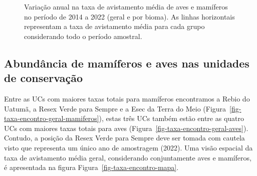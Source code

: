 \documentclass[
  letterpaper,
]{scrbook}
\begin{document}
\begin{figure}[H]


\caption{\label{fig-taxa-encontro-tempo}Variação anual na taxa de
avistamento média de aves e mamíferos no período de 2014 a 2022 (geral e
por bioma). As linhas horizontais representam a taxa de avistamento
média para cada grupo considerando todo o período amostral.}

\end{figure}%

\subsection{Abundância de mamíferos e aves nas unidades de
conservação}\label{abunduxe2ncia-de-mamuxedferos-e-aves-nas-unidades-de-conservauxe7uxe3o}

Entre as UCs com maiores taxas totais para mamíferos encontramos a Rebio
do Uatumã, a Resex Verde para Sempre e a Esec da Terra do Meio
(Figura~\ref{fig-taxa-encontro-geral-mamiferos}), estas três UCs também
estão entre as quatro UCs com maiores taxas totais para aves
(Figura~\ref{fig-taxa-encontro-geral-aves}). Contudo, a posição da Resex
Verde para Sempre deve ser tomada com cautela visto que representa um
único ano de amostragem (2022). Uma visão espacial da taxa de
avistamento média geral, considerando conjuntamente aves e mamíferos, é
apresentada na figura Figura~\ref{fig-taxa-encontro-mapa}.
\end{document}
